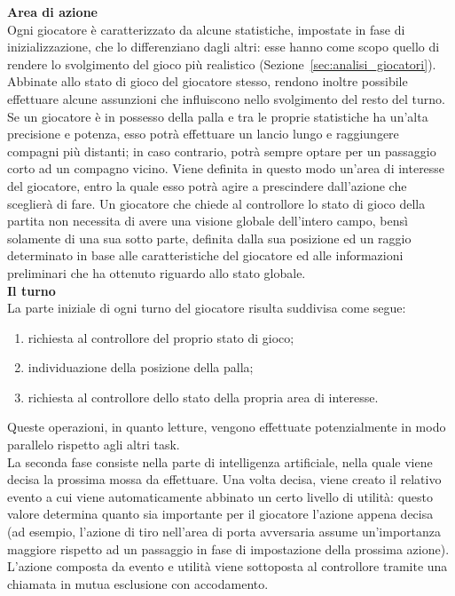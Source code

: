 \textbf{Area di azione}\\

Ogni giocatore è caratterizzato da alcune statistiche, impostate in fase di inizializzazione, che lo differenziano dagli altri: esse hanno come scopo quello di rendere lo svolgimento del gioco più realistico (Sezione~\ref{sec:analisi_giocatori}). Abbinate allo stato di gioco del giocatore stesso, rendono inoltre possibile effettuare alcune assunzioni che influiscono nello svolgimento del resto del turno.\\

Se un giocatore è in possesso della palla e tra le proprie statistiche ha un'alta precisione e potenza, esso potrà effettuare un lancio lungo e raggiungere compagni più distanti; in caso contrario, potrà sempre optare per un passaggio corto ad un compagno vicino. Viene definita in questo modo un'area di interesse del giocatore, entro la quale esso potrà agire a prescindere dall'azione che sceglierà di fare. Un giocatore che chiede al controllore lo stato di gioco della partita non necessita di avere una visione globale dell'intero campo, bensì solamente di una sua sotto parte, definita dalla sua posizione ed un raggio determinato in base alle caratteristiche del giocatore ed alle informazioni preliminari che ha ottenuto riguardo allo stato globale.\\

\textbf{Il turno}\\

La parte iniziale di ogni turno del giocatore risulta suddivisa come segue:

\begin{enumerate}
	\item richiesta al controllore del proprio stato di gioco;
	\item individuazione della posizione della palla;
	\item richiesta al controllore dello stato della propria area di interesse.
\end{enumerate}

Queste operazioni, in quanto letture, vengono effettuate potenzialmente in modo parallelo rispetto agli altri task.\\

La seconda fase consiste nella parte di intelligenza artificiale, nella quale viene decisa la prossima mossa da effettuare. Una volta decisa, viene creato il relativo evento a cui viene automaticamente abbinato un certo livello di utilità: questo valore determina quanto sia importante per il giocatore l'azione appena decisa (ad esempio, l'azione di tiro nell'area di porta avversaria assume un'importanza maggiore rispetto ad un passaggio in fase di impostazione della prossima azione). L'azione composta da evento e utilità viene sottoposta al controllore tramite una chiamata in mutua esclusione con accodamento.\\

